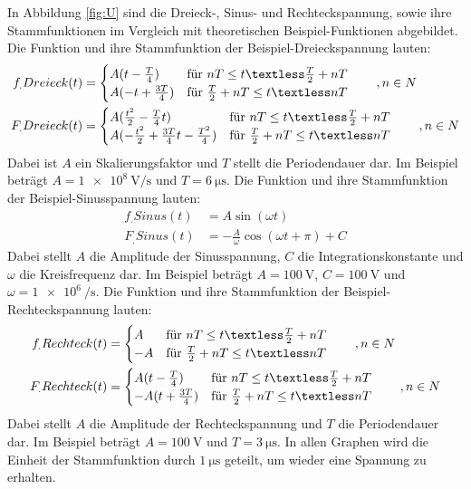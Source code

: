 In Abbildung \ref{fig:U} sind die Dreieck-, Sinus- und Rechteckspannung, sowie ihre Stammfunktionen im Vergleich mit theoretischen Beispiel-Funktionen abgebildet.
Die Funktion und ihre Stammfunktion der Beispiel-Dreieckspannung lauten:
\begin{align*}
f_.{Dreieck}(t)	&= 
	\begin{cases}
    A(t-\frac{T}{4})	& \text{für } nT \le t \textless \frac{T}{2}+nT\\
    A(-t+\frac{3T}{4})	& \text{für } \frac{T}{2}+nT \le t \textless nT
   	\end{cases}
\hspace{2em},n\in N \\
F_.{Dreieck}(t)	&= 
	\begin{cases}
    A(\frac{t^2}{2}-\frac{T}{4}t)					& \text{für } nT \le t \textless \frac{T}{2}+nT\\
    A(-\frac{t^2}{2}+\frac{3T}{4}t-\frac{T^2}{4})	& \text{für } \frac{T}{2}+nT \le t \textless nT
   	\end{cases}
\hspace{2em},n\in N \\
\end{align*} 
Dabei ist $A$ ein Skalierungsfaktor und $T$ stellt die Periodendauer dar. Im Beispiel beträgt $A=\SI{1e8}{\volt\per\second}$ und $T=\SI{6}{\micro\second}$. 
Die Funktion und ihre Stammfunktion der Beispiel-Sinusspannung lauten:
\begin{align*}
f_.{Sinus}(t)	&= A\sin(\omega t) \\
F_.{Sinus}(t)	&= -\frac{A}{\omega}\cos(\omega t +\pi)+C
\end{align*} 
Dabei stellt $A$ die Amplitude der Sinusspannung, $C$ die Integrationskonstante und $\omega$ die Kreisfrequenz dar. Im Beispiel beträgt $A=\SI{100}{\volt}$, $C=\SI{100}{\volt}$ und $\omega=\SI{1e6}{\per\second}$.
Die Funktion und ihre Stammfunktion der Beispiel-Rechteckspannung lauten:
\begin{align*}
f_.{Rechteck}(t)&=
	\begin{cases}
     A	& \text{für } nT \le t \textless \frac{T}{2}+nT\\
     -A  & \text{für } \frac{T}{2}+nT \le t \textless nT
   	\end{cases}
\hspace{2em},n\in N \\
F_.{Rechteck}(t)&=
	\begin{cases}
    A(t-\frac{T}{4}) 	& \text{für } nT \le t \textless \frac{T}{2}+nT\\
    -A(t+\frac{3T}{4})	& \text{für } \frac{T}{2}+nT \le t \textless nT
   	\end{cases}
\hspace{2em},n\in N \\
\end{align*} 
Dabei stellt $A$ die Amplitude der Rechteckspannung und $T$ die Periodendauer dar. Im Beispiel beträgt $A=\SI{100}{\volt}$ und $T=\SI{3}{\micro\second}$.
In allen Graphen wird die Einheit der Stammfunktion durch $\SI{1}{\micro\second}$ geteilt, um wieder eine Spannung zu erhalten.  
